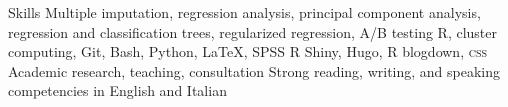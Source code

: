 
\begin{rubric}{Skills}
Multiple imputation, regression analysis, principal component analysis, regression and classification trees, regularized regression, A/B testing
R, cluster computing, Git, Bash, Python, \LaTeX, SPSS
R Shiny, Hugo, R blogdown, \textsc{css}
\entry*[Miscellaneous]
Academic research, teaching, consultation
\entry*[Languages]
	Strong reading, writing, and speaking competencies in English and Italian
\end{rubric}
